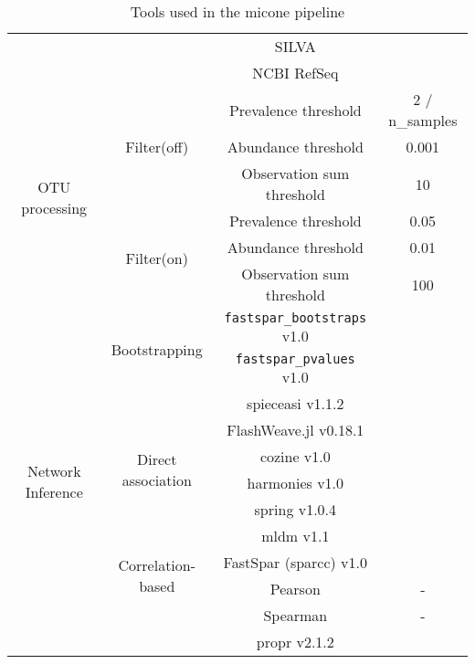 \begin{table}[h]
\begin{tabular}{|c|c|c|c|}
                                           & & SILVA & \cite{Quast2012} \\
                                           & & NCBI RefSeq & \cite{Sayers2009} \\
      \hline
      \multirow{6}{*}{OTU processing} & \multirow{3}{*}{Filter(off)} & Prevalence threshold      & 2 / n\_samples \\
                                      & & Abundance threshold       & 0.001          \\
                                      & & Observation sum threshold & 10             \\ \cline{2-4}
                                      & \multirow{3}{*}{Filter(on)}  & Prevalence threshold      & 0.05           \\
                                      & & Abundance threshold       & 0.01           \\
                                      & & Observation sum threshold & 100            \\
      \hline
      \multirow{12}{*}{Network Inference} & \multirow{2}{*}{Bootstrapping}& \texttt{fastspar\_bootstraps} v1.0 & \cite{Watts2018} \\
                                          & & \texttt{fastspar\_pvalues} v1.0 & \cite{Watts2018} \\
                                          \cline{2-4}
                                          & \multirow{6}{*}{Direct association} & \ac{spieceasi} v1.1.2 & \cite{Kurtz2015} \\
                                          & & FlashWeave.jl v0.18.1 & \cite{tackmannRapidInferenceDirect2019} \\
                                          & & \ac{cozine} v1.0 & \cite{haCompositionalZeroinflatedNetwork2020a} \\
                                          & & \ac{harmonies} v1.0 & \cite{jiangHARMONIESHybridApproach2020} \\
                                          & & \ac{spring} v1.0.4 & \cite{yoonMicrobialNetworksSPRING2019} \\
                                          & & \ac{mldm} v1.1 & \cite{Yang2017} \\
                                          \cline{2-4}
                                          & \multirow{2}{*}{Correlation-based} & FastSpar (\ac{sparcc}) v1.0 & \cite{Watts2018} \\
                                          & & Pearson & - \\
                                          & & Spearman & - \\
                                          & & propr v2.1.2 & \cite{quinnProprRpackageIdentifying2017} \\
      \hline
    \end{tabular}
    \caption{Tools used in the \ac{micone} pipeline}
    \label{tab:micone_tools}
  \end{table}

